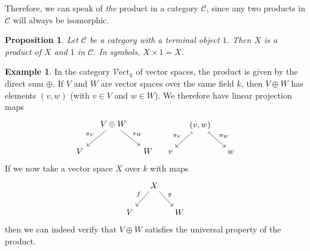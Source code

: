 \documentclass[10pt,oneside]{book}
\def\~#1{\mathscr{#1}}
\newcommand{\Vect}{\~V\mathrm{ect}}
\theoremstyle{plain}
\newtheorem{prop}[thm]{Proposition}
\theoremstyle{definition}
\newtheorem{ex}[thm]{Example}
\theoremstyle{remark}
\numberwithin{equation}{section}
\numberwithin{figure}{section}
\begin{document}
Therefore, we can speak of \emph{the} product in a category $\~C$, since any two products in $\~C$ will always be isomorphic. 

\begin{prop}
    Let $\~C$ be a category with a terminal object $1$. Then $X$ is a product of $X$ and $1$ in $\~C$. In symbols, $X \times 1 = X$.
\end{prop}

\begin{ex}
In the category $\Vect_k$ of vector spaces, the product is given by the direct sum $\oplus$. If $V$ and $W$ are vector spaces over the same field $k$, then $V \oplus W$ has elements $(v, w)$ (with $v \in V$ and $w \in W$). We therefore have linear projection maps
\[\begin{tikzcd}[column sep=small]
    & V \oplus W \\
    V && W
    \arrow["{\pi_V}"', from=1-2, to=2-1]
    \arrow["{\pi_W}", from=1-2, to=2-3]
    \end{tikzcd} \quad \begin{tikzcd}[column sep=small]
    & {(v, w)} \\
    v && w
    \arrow["{\pi_V}"', maps to, from=1-2, to=2-1]
    \arrow["{\pi_W}", maps to, from=1-2, to=2-3]
\end{tikzcd}\]
If we now take a vector space $X$ over $k$ with maps
\[\begin{tikzcd}[column sep=small]
    & X \\
    V && W
    \arrow["{f}"', from=1-2, to=2-1]
    \arrow["{g}", from=1-2, to=2-3]
    \end{tikzcd}\]
then we can indeed verify that $V \oplus W$ satisfies the universal property of the product.
\end{ex}
\end{document}
